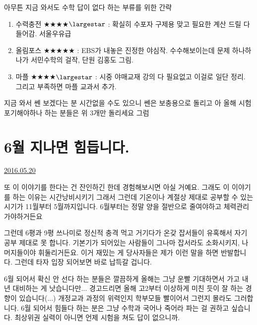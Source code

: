 아무튼 지금 와서도 수학 답이 없다 하는 부류를 위한 간략
\vspace{5mm}
\begin{enumerate}
    \item 수력충전 $\bigstar$$\bigstar$$\bigstar$$\bigstar$$\largestar$ : 확실히 수포자 구제용 맞고 필요한 계산 드릴 다 들어감. 서울우유급
    \item 올림포스 $\bigstar$$\bigstar$$\bigstar$$\bigstar$$\bigstar$ : EBS가 내놓은 진정한 야심작. 수수해보이는데 문제 하나하나가 서민수학의 걸작, 단원 김홍도 그림.
    \item 마플 $\bigstar$$\bigstar$$\bigstar$$\bigstar$$\largestar$ : 시중 야매교재 강의 다 필요없고 이걸로 일단 정리. 그리고 부족하면 마플 교과서 추가.
\end{enumerate}
\vspace{5mm}

지금 와서 쎈 보겠다는 분 시간없을 수도 있으니 쎈은 보충용으로 돌리고
아 올해 시험 포기해야하나 하는 분들은 위 3개만 돌리세요 그럼
\vspace{5mm}










\section{6월 지나면 힘듭니다.}
\href{https://www.kockoc.com/Apoc/784341}{2016.05.20}

\vspace{5mm}

또 이 이야기를 한다는 건 잔인하긴 한데 경험해보시면 아실 거예요.
그래도 이 이야기를 하는 이유는 시간낭비시키기 그래서 그런데
기온이나 계절상 제대로 공부할 수 있는 시기가 11월부터 5월까지입니다. 6월부터는 정말 양을 절반으로 줄여야하고 체력관리가야하거든요
\vspace{5mm}

그런데 6평과 9평 쓰나미로 정신적 충격 먹고 거기다가 온갖 잡서들이 유혹해서 자기 공부 제대로 못 합니다.
기본기가 되어있는 사람들이 그나마 잡서라도 소화시키지, 나머지들이야 휘둘리거든요.
이거 재밌는 게 당사자들은 제가 이런 말을 하면 반발합니다. 그런데 타자 입장 되어보면 바로 납득갈 겁니다.
\vspace{5mm}

6월 되어서 확신 안 선다 하는 분들은 깔끔하게 올해는 그냥 운빨 기대하면서 가고 내년 대비하는 게 낫습니다만...
경고드리면 올해 고2부터 이상하게 미친 듯이 잘 하는 경향이 있습니다(...) 개정교과 과정의 위력인지 학부모들 빨이어서 그런지 몰라도 그러합니다.
6월 되어서 힘들다 하는 분은 그냥 수학과 국어나 죽어라 파는 걸 권하고 싶습니다. 최상위권 실력이 아니면 언제 시험을 쳐도 답이 없으니까.
\vspace{5mm}

